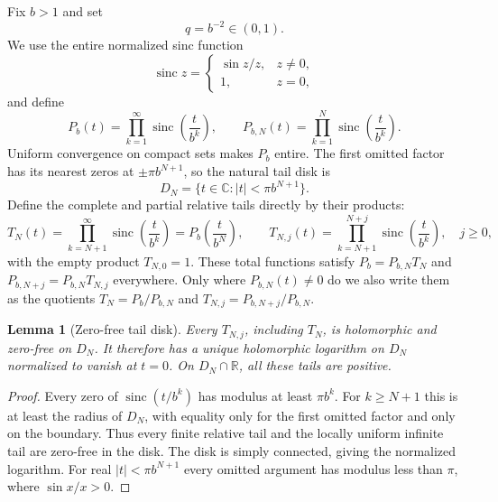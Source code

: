 \documentclass[11pt]{article}
\numberwithin{equation}{section}
\newtheorem{lemma}[theorem]{Lemma}
\theoremstyle{definition}
\theoremstyle{remark}
\newcommand{\R}{\mathbb R}
\newcommand{\C}{\mathbb C}
\newcommand{\sinc}{\operatorname{sinc}}
\begin{document}
Fix $b>1$ and set
\begin{equation}
 q=b^{-2}\in(0,1).
 \label{p3:eq:qdef}
\end{equation}
We use the entire normalized sinc function
\[
 \sinc z=\begin{cases}\sin z/z,&z\ne0,\\1,&z=0,
 \end{cases}
\]
and define
\begin{equation}
 P_b(t)=\prod_{k=1}^{\infty}\sinc\!\left(\frac{t}{b^k}\right),
 \qquad
 P_{b,N}(t)=\prod_{k=1}^{N}\sinc\!\left(\frac{t}{b^k}\right).
 \label{p3:eq:Pb}
\end{equation}
Uniform convergence on compact sets makes $P_b$ entire.  The first omitted factor has its
nearest zeros at $\pm\pi b^{N+1}$, so the natural tail disk is
\begin{equation}
 D_N=\{t\in\C:|t|<\pi b^{N+1}\}.
 \label{p3:eq:DN}
\end{equation}
Define the complete and partial relative tails directly by their products:
\begin{equation}
 T_N(t)=\prod_{k=N+1}^{\infty}\sinc\!\left(\frac{t}{b^k}\right)
       =P_b\!\left(\frac{t}{b^N}\right),
 \qquad
 T_{N,j}(t)=\prod_{k=N+1}^{N+j}\sinc\!\left(\frac{t}{b^k}\right),\quad j\ge0,
 \label{p3:eq:tails}
\end{equation}
with the empty product $T_{N,0}=1$.  These total functions satisfy
$P_b=P_{b,N}T_N$ and $P_{b,N+j}=P_{b,N}T_{N,j}$ everywhere.  Only where
$P_{b,N}(t)\ne0$ do we also write them as the quotients
$T_N=P_b/P_{b,N}$ and $T_{N,j}=P_{b,N+j}/P_{b,N}$.

\begin{lemma}[Zero-free tail disk]\label{p3:lem:zero-free-tail}
Every $T_{N,j}$, including $T_N$, is holomorphic and zero-free on $D_N$.  It therefore has a
unique holomorphic logarithm on $D_N$ normalized to vanish at $t=0$.  On
$D_N\cap\R$, all these tails are positive.
\end{lemma}

\begin{proof}
Every zero of $\sinc(t/b^k)$ has modulus at least $\pi b^k$.  For $k\ge N+1$
this is at least the radius of $D_N$, with equality only for the first omitted factor and only
on the boundary.  Thus every finite relative tail and the locally uniform infinite tail are
zero-free in the disk.  The disk is simply connected, giving the normalized logarithm.
For real $|t|<\pi b^{N+1}$ every omitted argument has modulus less than $\pi$, where
$\sin x/x>0$.
\end{proof}
\end{document}
